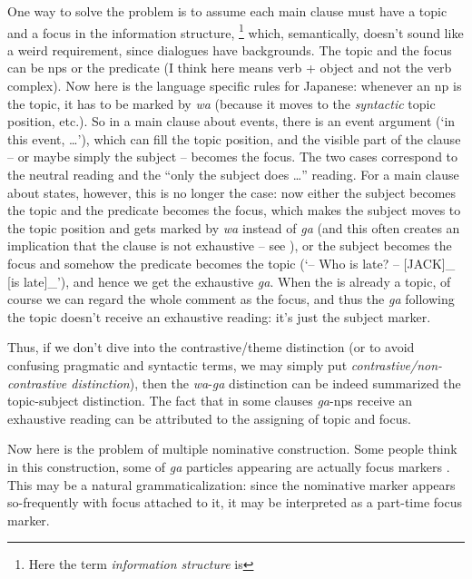 \documentclass[UTF8, a4paper, oneside, scheme=plain]{ctexart}
\newcommand*{\term}[1]{\emph{#1}}
\newcommand{\corpus}[1]{\emph{#1}}
\newcommand{\translate}[1]{`#1'}
\begin{document}
One way to solve the problem is to assume each main clause must have a topic and a focus
in the information structure,%
\footnote{
    Here the term \term{information structure} is 
}
which, semantically, doesn't sound like a weird requirement,
since dialogues have backgrounds.
The topic and the focus can be \ac{np}s or the predicate 
(I think here \citet{heycock2008} means verb + object and not the verb complex).
Now here is the language specific rules for Japanese:
whenever an \ac{np} is the topic, it has to be marked by \corpus{wa} 
(because it moves to the \emph{syntactic} topic position, etc.).
So in a main clause about events,
there is an event argument (\translate{in this event, \dots}),
which can fill the topic position, 
and the visible part of the clause -- or maybe simply the subject -- becomes the focus.
The two cases correspond to 
the neutral reading and the ``only the subject does \dots'' reading.
For a main clause about states, however,
this is no longer the case:
now either the subject becomes the topic and the predicate becomes the focus,
which makes the subject moves to the topic position and gets marked by \corpus{wa} instead of \corpus{ga}
(and this often creates an implication that the clause is not exhaustive -- 
see \citet[(2)]{heycock2008}),
or the subject becomes the focus and somehow the predicate becomes the topic 
(\translate{-- Who is late? -- [JACK]_{} [is late]_{\text{old information}}}),
and hence we get the exhaustive \corpus{ga}.
When the is already a topic, of course we can regard the whole comment as the focus,
and thus the \corpus{ga} following the topic doesn't receive an exhaustive reading:
it's just the subject marker.

Thus, if we don't dive into the contrastive/theme distinction
(or to avoid confusing pragmatic and syntactic terms,
we may simply put \term{contrastive/non-contrastive distinction}),
then the \corpus{wa}-\corpus{ga} distinction can be indeed summarized the topic-subject distinction.
The fact that in some clauses \corpus{ga}-\ac{np}s receive an exhaustive reading 
can be attributed to the assigning of topic and focus.

Now here is the problem of multiple nominative construction.
Some people think in this construction, 
some of \corpus{ga} particles appearing are actually focus markers 
\citep{vermeulen2002ga,vermeulen2005two}.
This may be a natural grammaticalization:
since the nominative marker appears so-frequently with focus attached to it,
it may be interpreted as a part-time focus marker.
\end{document}
